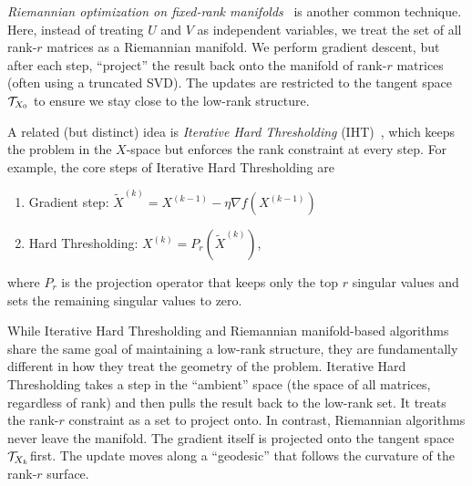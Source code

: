 {\em Riemannian optimization on fixed-rank manifolds}~\cite{vandereycken2013low,absil2008optimization}
is another common technique. Here, instead of treating $U$ and $V$ as independent variables, we treat the set of all rank-$r$ matrices as a Riemannian manifold.
We perform gradient descent, but after each step, ``project'' the result back onto the manifold of rank-$r$ matrices (often using a truncated SVD).
The updates are restricted to the tangent space $\mathcal{T}_{X_0}$ to ensure we stay close to the low-rank structure.


A related (but distinct) idea is {\em Iterative Hard Thresholding} (IHT)~\cite{recht2010guaranteed},
which keeps the problem in the $X$-space but enforces the rank constraint at every step. For example, the core steps of Iterative Hard Thresholding are
\begin{enumerate}
\setlength{\itemsep}{0.8pt}
\item  Gradient step: $\tilde{X}^{(k)} = X^{(k-1)} - \eta \nabla f(X^{(k-1)})$
\item Hard Thresholding: $X^{(k)} = P_r(\tilde{X}^{(k)})$, 
\end{enumerate}
where $P_r$ is the projection operator that keeps only the top $r$ singular values and sets the remaining singular values to zero. 

While Iterative Hard Thresholding and Riemannian manifold-based algorithms  share the same goal of maintaining a low-rank structure, they are fundamentally different in how they treat the geometry of the problem.
Iterative Hard Thresholding takes a step in the ``ambient'' space (the space of all matrices, regardless of rank) and then pulls the result back to the low-rank set. It treats the rank-$r$ constraint as a set to project onto. In contrast, Riemannian algorithms never leave the manifold. The gradient itself is projected onto the tangent space $\mathcal{T}_{X_k}$first. The update moves along a ``geodesic'' that follows the curvature of the rank-$r$ surface.

